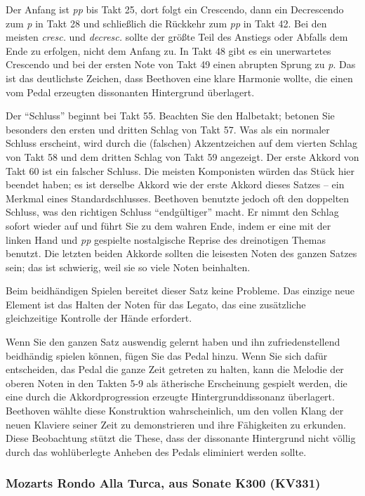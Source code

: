 Der Anfang ist \textit{pp} bis Takt 25, dort folgt ein Crescendo, dann ein Decrescendo zum \textit{p} in Takt 28 und schließlich die Rückkehr zum \textit{pp} in Takt 42.
Bei den meisten \textit{cresc.} und \textit{decresc.} sollte der größte Teil des Anstiegs oder Abfalls dem Ende zu erfolgen, nicht dem Anfang zu.
In Takt 48 gibt es ein unerwartetes Crescendo und bei der ersten Note von Takt 49 einen abrupten Sprung zu \textit{p}.
Das ist das deutlichste Zeichen, dass Beethoven eine klare Harmonie wollte, die einen vom Pedal erzeugten dissonanten Hintergrund überlagert.

Der \enquote{Schluss} beginnt bei Takt 55.
Beachten Sie den Halbetakt; betonen Sie besonders den ersten und dritten Schlag von Takt 57.
Was als ein normaler Schluss erscheint, wird durch die (falschen) Akzentzeichen auf dem vierten Schlag von Takt 58 und dem dritten Schlag von Takt 59 angezeigt.
Der erste Akkord von Takt 60 ist ein falscher Schluss.
Die meisten Komponisten würden das Stück hier beendet haben; es ist derselbe Akkord wie der erste Akkord dieses Satzes -- ein Merkmal eines Standardschlusses.
Beethoven benutzte jedoch oft den doppelten Schluss, was den richtigen Schluss \enquote{endgültiger} macht.
Er nimmt den Schlag sofort wieder auf und führt Sie zu dem wahren Ende, indem er eine mit der linken Hand und \textit{pp} gespielte nostalgische Reprise des dreinotigen Themas benutzt.
Die letzten beiden Akkorde sollten die leisesten Noten des ganzen Satzes sein; das ist schwierig, weil sie so viele Noten beinhalten.

Beim beidhändigen Spielen bereitet dieser Satz keine Probleme.
Das einzige neue Element ist das Halten der Noten für das Legato, das eine zusätzliche gleichzeitige Kontrolle der Hände erfordert.

Wenn Sie den ganzen Satz auswendig gelernt haben und ihn zufriedenstellend beidhändig spielen können, fügen Sie das Pedal hinzu.
Wenn Sie sich dafür entscheiden, das Pedal die ganze Zeit getreten zu halten, kann die Melodie der oberen Noten in den Takten 5-9 als ätherische Erscheinung gespielt werden, die eine durch die Akkordprogression erzeugte Hintergrunddissonanz überlagert.
Beethoven wählte diese Konstruktion wahrscheinlich, um den vollen Klang der neuen Klaviere seiner Zeit zu demonstrieren und ihre Fähigkeiten zu erkunden.
Diese Beobachtung stützt die These, dass der dissonante Hintergrund nicht völlig durch das wohlüberlegte Anheben des Pedals eliminiert werden sollte.


\subsubsection{Mozarts Rondo Alla Turca, aus Sonate K300 (KV331)}
\label{c1ii25c}


